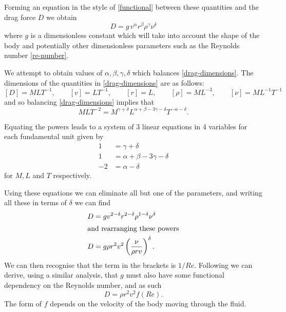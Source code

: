 Forming an equation in the style of \eqref{functional} between these quantities and the drag force 
$D$ we obtain
\begin{equation} \label{drag-dimensions}
D = g \, v^{\alpha} r^{\beta} \rho^{\gamma} \nu^{\delta}
\end{equation}
where $g$ is a dimensionless constant which will take into account the shape of the body and
potentially other dimensionless parameters such as the Reynolds number \eqref{re-number}.

We attempt to obtain values of $\alpha, \beta, \gamma, \delta$ which balances \eqref{drag-dimensions}.
The dimensions of the quantities in \eqref{drag-dimensions} are as follows:
\begin{equation} \nonumber
[D] = M L T^{-1}, \qquad [v] = L T^{-1}, \qquad [r] = L, \qquad [\rho] = M L^{-3}, \qquad [\nu] = M L^{-1} T^{-1}
\end{equation}
and so balancing \eqref{drag-dimensions} implies that
\begin{equation}
M L T^{-2} = M^{\gamma + \delta} L^{\alpha + \beta - 3\gamma - \delta} T^{-\alpha-\delta} .
\end{equation}

Equating the powers leads to a system of 3 linear equations in 4 variables for each fundamental unit
given by
\begin{subequations}
\begin{align}
1 &= \gamma + \delta \\
1 &= \alpha + \beta - 3 \gamma - \delta \\
-2 &= \alpha - \delta
\end{align}
\end{subequations}
for $M, L$ and $T$ respectively.

Using these equations we can eliminate all but one of the parameters, and writing all these in terms
of $\delta$ we can find
\begin{align}
D &= g v^{2-\delta} r^{2-\delta} \rho^{1-\delta} \nu^{\delta} \\
\shortintertext{and rearranging these powers}
D &= g \rho r^2 v^2 \left(\frac{\nu}{\rho r v}\right)^{\delta} .
\end{align}
We can then recognise that the term in the brackets is $1/Re$. Following \citet{jensen2013introducing}
we can derive, using a similar analysis, that $g$ must also have some functional dependency on the
Reynolds number, and as such
\begin{equation} \label{drag-functional}
D = \rho r^2 v^2 f(Re) .
\end{equation}
The form of $f$ depends on the velocity of the body moving through the fluid. 

